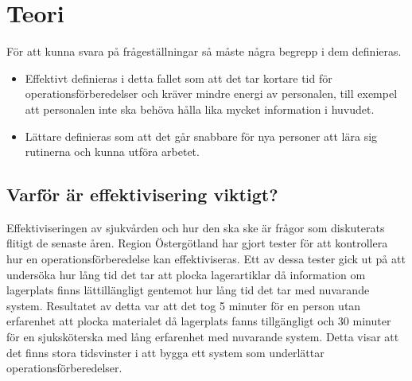 \documentclass{article}
\begin{document}
\section{Teori}

För att kunna svara på frågeställningar så måste några begrepp i dem definieras.
\begin{itemize}
\item Effektivt definieras i detta fallet som att det tar kortare tid för operationsförberedelser och kräver mindre energi av personalen, till exempel att personalen inte ska behöva hålla lika mycket information i huvudet. 
\item Lättare definieras som att det går snabbare för nya personer att lära sig rutinerna och kunna utföra arbetet.
\end{itemize}

\subsection{Varför är effektivisering viktigt?}
Effektiviseringen av sjukvården och hur den ska ske är frågor som diskuterats flitigt de senaste åren. Region Östergötland har gjort tester för att kontrollera hur en operationsförberedelse kan effektiviseras. Ett av dessa tester gick ut på att undersöka hur lång tid det tar att plocka lagerartiklar då information om lagerplats finns lättillängligt gentemot hur lång tid det tar med nuvarande system. Resultatet av detta var att det tog 5 minuter för en person utan erfarenhet att plocka materialet då lagerplats fanns tillgängligt och 30 minuter för en sjuksköterska med lång erfarenhet med nuvarande system. Detta visar att det finns stora tidsvinster i att bygga ett system som underlättar operationsförberedelser.



 
\end{document}
